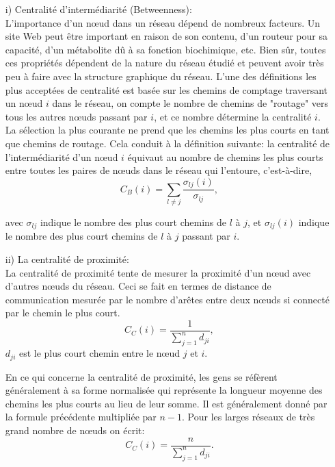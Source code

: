 \begin{itemize}
	\item[i)] Centralité d'intermédiarité (Betweenness):\\
	L'importance d'un nœud dans un réseau dépend de nombreux facteurs. Un site Web peut être important en raison de son contenu, d'un routeur pour sa capacité, d'un métabolite dû à sa fonction biochimique, etc. Bien sûr, toutes ces propriétés dépendent de la nature du réseau étudié et peuvent avoir très peu à faire avec la structure graphique du réseau. L'une des définitions les plus acceptées de centralité est basée sur les chemins de comptage traversant un nœud $i$ dans le réseau, on compte le nombre de chemins de "routage" vers tous les autres nœuds passant par $i$, et ce nombre détermine la centralité $i$. La sélection la plus courante ne prend que les chemins les plus courts en tant que chemins de routage. Cela conduit à la définition suivante: la centralité de l'intermédiarité d'un nœud $i$ équivaut au nombre de chemins les plus courts entre toutes les paires de nœuds dans le réseau qui l'entoure, c'est-à-dire,
	\begin{equation}
	C_B(i)=\sum_{l\neq j}\dfrac{\sigma_{lj}(i)}{\sigma_{lj}},
	\end{equation}
	
	avec $\sigma_{lj}$ indique le nombre des plus court chemins de $l$ à $j$, et $\sigma_{lj}(i)$ indique le nombre des plus court chemins de $l$ à $j$ passant par $i$.
	
	\item[ii)] La centralité de proximité:\\
	La centralité de proximité tente de mesurer la proximité d'un nœud avec d'autres nœuds du réseau. Ceci se fait en termes de distance de communication mesurée par le nombre d'arêtes entre deux nœuds si connecté par le chemin le plus court.
	\begin{equation}
	C_C(i)=\dfrac{1}{\sum_{j=1}^nd_{ji}},
	\end{equation}
	$d_{ji}$ est le plus court chemin entre le nœud $j$ et $i$.
	
	En ce qui concerne la centralité de proximité, les gens se réfèrent généralement à sa forme normalisée qui représente la longueur moyenne des chemins les plus courts au lieu de leur somme. Il est généralement donné par la formule précédente multipliée par $n-1$. Pour les larges réseaux de très grand nombre de nœuds on écrit:
	\begin{equation}
	C_C(i)=\dfrac{n}{\sum_{j=1}^nd_{ji}}.
	\end{equation}
\end{itemize}

